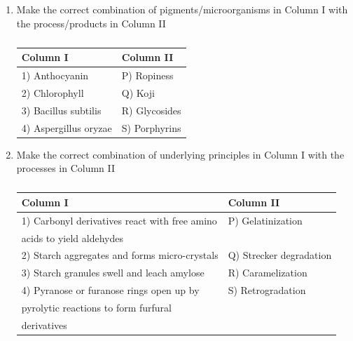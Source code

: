 \documentclass[a4paper,10pt]{article}
\begin{document}
\begin{enumerate}
    \item Make the correct combination of pigments/microorganisms in Column I with the process/products in Column II
    \begin{table}[h!] \centering \caption*{} \label{tab:q13_food}
        \begin{tabular}{ll} \hline
            \textbf{Column I} & \textbf{Column II} \\ \hline
            1) Anthocyanin & P) Ropiness \\
            2) Chlorophyll & Q) Koji \\
            3) Bacillus subtilis & R) Glycosides \\
            4) Aspergillus oryzae & S) Porphyrins \\ \hline
        \end{tabular}
    \end{table}
    
    \hfill{}
    \begin{enumerate}[label=\Alph*)]
    \end{enumerate}
    
    \item Make the correct combination of underlying principles in Column I with the processes in Column II
    \begin{table}[h!] \centering \caption*{} \label{tab:q14_food}
        \begin{tabular}{ll} \hline
            \textbf{Column I} & \textbf{Column II} \\ \hline
            1) Carbonyl derivatives react with free amino & P) Gelatinization \\
            \hspace{3mm} acids to yield aldehydes & \\
            2) Starch aggregates and forms micro-crystals & Q) Strecker degradation \\
            3) Starch granules swell and leach amylose & R) Caramelization \\
            4) Pyranose or furanose rings open up by & S) Retrogradation \\
            \hspace{3mm} pyrolytic reactions to form furfural & \\
            \hspace{3mm} derivatives & \\ \hline
        \end{tabular}
    \end{table}
    

\end{enumerate}
\end{document}
